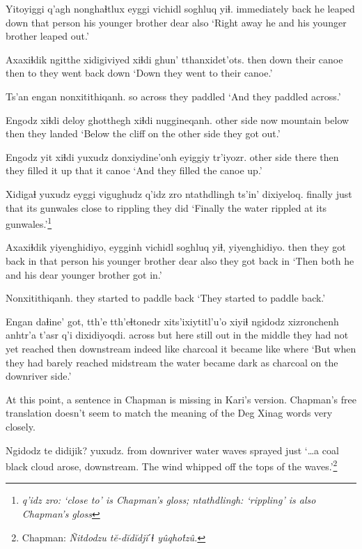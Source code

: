 \documentclass[12pt]{article}
\begin{document}
\gll Yitoyiggi q'agh nonghaɬtlux  eyggi vichidl  soghluq yiɬ.
immediately back {he leaped down} {that person} {his younger brother} dear  also
\glt `Right away he and his younger brother leaped out.'
\glend

\gll Axaxiɬdik ngitthe xidigiviyed xiɬdi ghun' tthanxidet'ots.
then  down {their canoe} then to {they went back down}
\glt `Down they went to their canoe.'
\glend

\gll Ts'an engan  nonxitithiqanh.
so across  {they paddled}
\glt `And they paddled across.'
\glend

\gll Engodz xiɬdi deloy  ghotthegh xiɬdi nuggineqanh.
{other side} now mountain below  then {they landed}
\glt `Below the cliff on the other side they got out.'
\glend

\gll Engodz yit xiɬdi yuxudz donxiydine'onh eyiggiy tr'iyozr.
{other side} there then {} {they filled it up} that it canoe
\glt `And they filled the canoe up.'
\glend

\gll Xidigaɬ yuxudz  eyggi  vigughudz {q'idz zro} ntathdlingh ts'in' dixiyeloq.
finally  just  that {its gunwales} {close to} rippling {}  {they did}
\glt `Finally the water rippled at its gunwales.'\footnote{\em q'idz zro: \em `close to' is Chapman's gloss; \em ntathdlingh: \em `rippling' is also Chapman's gloss}
\glend

\gll Axaxiɬdik yiyenghidiyo, eygginh vichidl  soghluq yiɬ, yiyenghidiyo.
then  {they got back in} {that person} {his younger brother} dear  also {they got back in}
\glt `Then both he and his dear younger brother got in.'
\glend

\gll Nonxitithiqanh.
{{they started to paddle back}}
\glt `They started to paddle back.'
\glend

\gll Engan  daɬine' got, tth'e tth'eɬtonedr {xits'ixiytitl'u'o} xiyiɬ ngidodz xizronchenh anhtr'a t'asr  q'i dixidiyoqdi.
across  but  here still {out in the middle} {they had not yet reached} then downstream indeed   like  charcoal {it became like} where
\glt `But when they had barely reached midstream the water became dark as charcoal on the downriver side.'
\glend

At this point, a sentence in Chapman is missing in Kari's version. Chapman's free translation doesn't seem to match the meaning of the Deg Xinag words very closely.

\gll   Ngidodz te didijik? yuxudz.
     {from downriver} water {waves sprayed} just
\glt  `\ldots a coal black cloud arose, downstream. The wind whipped off the tops of the waves.'\footnote{Chapman: \em \~Nitdodzu t\u{e}-d\u{i}d\u{i}dj\u{i}ˊɬ y\^uqho\'tz\^u.}
\glend
\end{document}
